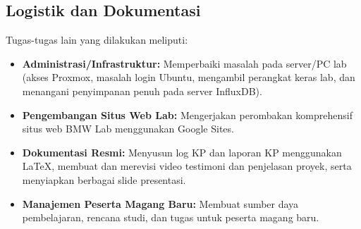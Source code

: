 \subsection{Logistik dan Dokumentasi}
Tugas-tugas lain yang dilakukan meliputi:
\begin{itemize}
    \item \textbf{Administrasi/Infrastruktur:} Memperbaiki masalah pada server/PC lab (akses Proxmox, masalah login Ubuntu, mengambil perangkat keras lab, dan menangani penyimpanan penuh pada server InfluxDB).
    \item \textbf{Pengembangan Situs Web Lab:} Mengerjakan perombakan komprehensif situs web BMW Lab menggunakan Google Sites.
    \item \textbf{Dokumentasi Resmi:} Menyusun log KP dan laporan KP menggunakan LaTeX, membuat dan merevisi video testimoni dan penjelasan proyek, serta menyiapkan berbagai slide presentasi.
    \item \textbf{Manajemen Peserta Magang Baru:} Membuat sumber daya pembelajaran, rencana studi, dan tugas untuk peserta magang baru.
\end{itemize}